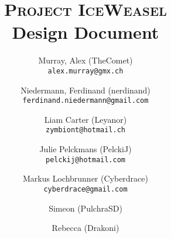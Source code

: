 \author{%
    Murray, Alex (TheComet)\\
    \texttt{alex.murray@gmx.ch}
    \and
    Niedermann, Ferdinand (nerdinand)\\
    \texttt{ferdinand.niedermann@gmail.com}
    \and
    Liam Carter (Leyanor)\\
    \texttt{zymbiont@hotmail.ch}
    \and
    Julie Pelckmans (PelckiJ)\\
    \texttt{pelckij@hotmail.com}
    \and
    Markus Lochbrunner (Cyberdrace)\\
    \texttt{cyberdrace@gmail.com}
    \and
    Simeon (PulchraSD)\\
    \texttt{}
    \and
    Rebecca (Drakoni)\\
    \texttt{}
}

\title{%
    \Huge{\textsc{Project IceWeasel}} \\
    \vspace{5mm}
    \small{Design Document}
    \vspace{5mm}
}

